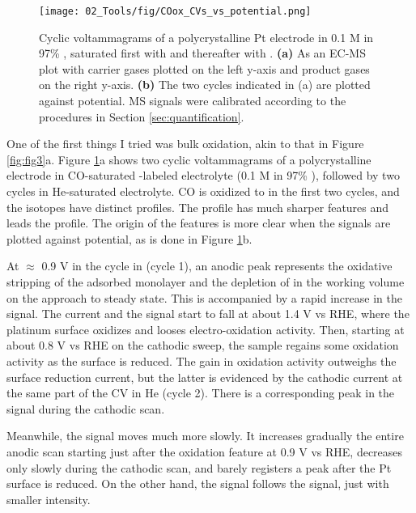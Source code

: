 \begin{figure}[h!]
	\centering
	\texttt{[image: 02\_Tools/fig/COox\_CVs\_vs\_potential.png]}
	\caption{Cyclic voltammagrams of a polycrystalline Pt electrode in 0.1 M  in 97\% , saturated first with  and thereafter with . \textbf{(a)} As an EC-MS plot with carrier gases plotted on the left y-axis and product gases on the right y-axis. \textbf{(b)} The two cycles indicated in (a) are plotted against potential. MS signals were calibrated according to the procedures in Section \ref{sec:quantification}.}
	\label{fig:COox_CVs}
\end{figure}
One of the first things I tried was bulk  oxidation, akin to that in Figure \ref{fig:fig3}a. Figure \ref{fig:COox_CVs}a shows two cyclic voltammagrams of a polycrystalline  electrode in CO-saturated -labeled electrolyte (0.1 M  in 97\% ), followed by two cycles in He-saturated electrolyte. CO is oxidized to  in the first two cycles, and the  isotopes have distinct profiles. The  profile has much sharper features and leads the  profile. The origin of the features is more clear when the  signals are plotted against potential, as is done in Figure \ref{fig:COox_CVs}b. 

At $\approx$ 0.9 V in the cycle in  (cycle 1), an anodic peak represents the oxidative stripping of the adsorbed  monolayer and the depletion of  in the working volume on the approach to steady state. This is accompanied by a rapid increase in the  signal. The current and the  signal start to fall at about 1.4 V vs RHE, where the platinum surface oxidizes and looses  electro-oxidation activity. Then, starting at about 0.8 V vs RHE on the cathodic sweep, the sample regains some  oxidation activity as the surface is reduced. The gain in  oxidation activity outweighs the surface reduction current, but the latter is evidenced by the cathodic current at the same part of the CV in He (cycle 2). There is a corresponding peak in the  signal during the cathodic scan. 

Meanwhile, the  signal moves much more slowly. It increases gradually the entire anodic scan starting just after the oxidation feature at 0.9 V vs RHE, decreases only slowly during the cathodic scan, and barely registers a peak after the Pt surface is reduced. On the other hand, the  signal follows the  signal, just with smaller intensity.

